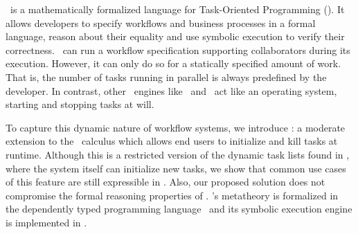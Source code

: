 %
%
\TOPHAT\ is a mathematically formalized language for Task-Oriented Programming (\TOP).
It allows developers to specify workflows and business processes in a formal language,
reason about their equality
and use symbolic execution to verify their correctness.
\TOPHAT\ can run a workflow specification supporting collaborators during its execution.
However, it can only do so for a statically specified amount of work.
That is, the number of tasks running in parallel is always predefined by the developer.
In contrast, other \TOP\ engines like \ITASKS\ and \MTASKS\ act like an operating system,
starting and stopping tasks at will.

To capture this dynamic nature of workflow systems,
we introduce \DYNTOPHAT:
a moderate extension to the \TOPHAT\ calculus which allows end users to initialize and kill tasks at runtime.
Although this is a restricted version of the dynamic task lists found in \ITASKS,
where the system itself can initialize new tasks,
we show that common use cases of this feature are still expressible in \DYNTOPHAT.
Also, our proposed solution does not compromise the formal reasoning properties of \TOPHAT.
\TOPHAT's metatheory is formalized in the dependently typed programming language \IDRIS\
and its symbolic execution engine is implemented in \HASKELL.


